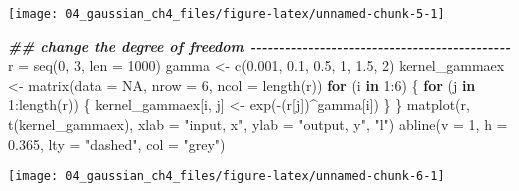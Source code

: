\documentclass[
]{article}
\newenvironment{Shaded}{\begin{snugshade}}{\end{snugshade}}
\newcommand{\AttributeTok}[1]{\textcolor[rgb]{0.77,0.63,0.00}{#1}}
\newcommand{\ConstantTok}[1]{\textcolor[rgb]{0.00,0.00,0.00}{#1}}
\newcommand{\ControlFlowTok}[1]{\textcolor[rgb]{0.13,0.29,0.53}{\textbf{#1}}}
\newcommand{\DecValTok}[1]{\textcolor[rgb]{0.00,0.00,0.81}{#1}}
\newcommand{\DocumentationTok}[1]{\textcolor[rgb]{0.56,0.35,0.01}{\textbf{\textit{#1}}}}
\newcommand{\FloatTok}[1]{\textcolor[rgb]{0.00,0.00,0.81}{#1}}
\newcommand{\FunctionTok}[1]{\textcolor[rgb]{0.00,0.00,0.00}{#1}}
\newcommand{\NormalTok}[1]{#1}
\newcommand{\OtherTok}[1]{\textcolor[rgb]{0.56,0.35,0.01}{#1}}
\newcommand{\SpecialCharTok}[1]{\textcolor[rgb]{0.00,0.00,0.00}{#1}}
\newcommand{\StringTok}[1]{\textcolor[rgb]{0.31,0.60,0.02}{#1}}
\begin{document}
\begin{center}\texttt{[image: 04\_gaussian\_ch4\_files/figure-latex/unnamed-chunk-5-1]} \end{center}

\begin{Shaded}
\begin{Highlighting}[]
\DocumentationTok{\#\# change the degree of freedom {-}{-}{-}{-}{-}{-}{-}{-}{-}{-}{-}{-}{-}{-}{-}{-}{-}{-}{-}{-}{-}{-}{-}{-}{-}{-}{-}{-}{-}{-}{-}{-}{-}{-}{-}{-}{-}{-}{-}{-}{-}{-}{-}{-}{-}}
\NormalTok{r }\OtherTok{=} \FunctionTok{seq}\NormalTok{(}\DecValTok{0}\NormalTok{, }\DecValTok{3}\NormalTok{, }\AttributeTok{len =} \DecValTok{1000}\NormalTok{)}
\NormalTok{gamma }\OtherTok{\textless{}{-}} \FunctionTok{c}\NormalTok{(}\FloatTok{0.001}\NormalTok{, }\FloatTok{0.1}\NormalTok{, }\FloatTok{0.5}\NormalTok{,}
          \DecValTok{1}\NormalTok{, }\FloatTok{1.5}\NormalTok{, }\DecValTok{2}\NormalTok{)}
\NormalTok{kernel\_gammaex }\OtherTok{\textless{}{-}} \FunctionTok{matrix}\NormalTok{(}\AttributeTok{data =} \ConstantTok{NA}\NormalTok{, }\AttributeTok{nrow =} \DecValTok{6}\NormalTok{, }\AttributeTok{ncol =} \FunctionTok{length}\NormalTok{(r))}
\ControlFlowTok{for}\NormalTok{ (i }\ControlFlowTok{in} \DecValTok{1}\SpecialCharTok{:}\DecValTok{6}\NormalTok{) \{}
  \ControlFlowTok{for}\NormalTok{ (j }\ControlFlowTok{in} \DecValTok{1}\SpecialCharTok{:}\FunctionTok{length}\NormalTok{(r)) \{}
\NormalTok{    kernel\_gammaex[i, j] }\OtherTok{\textless{}{-}} \FunctionTok{exp}\NormalTok{(}\SpecialCharTok{{-}}\NormalTok{(r[j])}\SpecialCharTok{\^{}}\NormalTok{gamma[i])}
\NormalTok{  \}}
\NormalTok{\}}
\FunctionTok{matplot}\NormalTok{(r, }\FunctionTok{t}\NormalTok{(kernel\_gammaex), }
        \AttributeTok{xlab =} \StringTok{"input, x"}\NormalTok{, }\AttributeTok{ylab =} \StringTok{"output, y"}\NormalTok{,}
        \StringTok{"l"}\NormalTok{)}
\FunctionTok{abline}\NormalTok{(}\AttributeTok{v =} \DecValTok{1}\NormalTok{, }\AttributeTok{h =} \FloatTok{0.365}\NormalTok{, }\AttributeTok{lty =} \StringTok{"dashed"}\NormalTok{, }\AttributeTok{col =} \StringTok{"grey"}\NormalTok{)}
\end{Highlighting}
\end{Shaded}

\begin{center}\texttt{[image: 04\_gaussian\_ch4\_files/figure-latex/unnamed-chunk-6-1]} \end{center}
\end{document}
